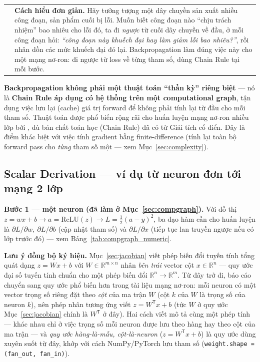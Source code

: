 \documentclass[12pt,a4paper]{article}
\makeatletter
\newenvironment{tructiep}[1][Cách hiểu đơn giản]
  {\par\smallskip\noindent\begin{tabular}{@{}p{0.35em}@{\hspace{6pt}}p{\dimexpr\linewidth-1.9em\relax}@{}}
   \textcolor{boxln}{\rule{2pt}{\baselineskip}} & \textbf{#1.}\enspace\ignorespaces}
  {\end{tabular}\par\smallskip}
\newcommand{\T}{^{\mathsf{T}}}
\makeatother
\begin{document}
\begin{tructiep}
Hãy tưởng tượng một dây chuyền sản xuất nhiều công đoạn, sản phẩm cuối bị
lỗi. Muốn biết công đoạn nào ``chịu trách nhiệm'' bao nhiêu cho lỗi đó, ta đi
\emph{ngược} từ cuối dây chuyền về đầu, ở mỗi công đoạn hỏi: \emph{``công
đoạn này khuếch đại hay làm giảm lỗi bao nhiêu?''}, rồi nhân dồn các mức
khuếch đại đó lại. Backpropagation làm đúng việc này cho một mạng nơ-ron:
đi ngược từ loss về từng tham số, dùng Chain Rule tại mỗi bước.
\end{tructiep}

\textbf{Backpropagation không phải một thuật toán ``thần kỳ'' riêng biệt} ---
nó là \textbf{Chain Rule áp dụng có hệ thống trên một computational graph},
tận dụng việc lưu lại (cache) giá trị forward để không phải tính lại từ
đầu cho mỗi tham số. Thuật toán được phổ biến rộng rãi cho huấn luyện mạng
nơ-ron nhiều lớp bởi \citet{rumelhart1986learning}, dù bản chất toán học
(Chain Rule) đã có từ Giải tích cổ điển. Đây là điểm khác biệt với việc
tính gradient bằng finite-difference (tính lại toàn bộ forward pass cho
\emph{từng} tham số một --- xem Mục~\ref{sec:complexity}).

\subsection{Scalar Derivation --- ví dụ từ neuron đơn tới mạng 2 lớp}
\label{sec:scalar}

\textbf{Bước 1 --- một neuron (đã làm ở Mục~\ref{sec:compgraph}).} Với đồ
thị $z=wx+b \to a=\mathrm{ReLU}(z) \to L=\tfrac12(a-y)^2$, ba đạo hàm cần
cho huấn luyện là $\partial L/\partial w,\ \partial L/\partial b$ (cập nhật
tham số) và $\partial L/\partial x$ (tiếp tục lan truyền ngược nếu có lớp
trước đó) --- xem Bảng~\ref{tab:compgraph_numeric}.

\textbf{Lưu ý đồng bộ ký hiệu.} Mục~\ref{sec:jacobian} viết phép biến đổi
tuyến tính tổng quát dạng $z=Wx+b$ với $W\in\mathbb R^{m\times n}$ nhân
\emph{bên trái} vector cột $x\in\mathbb R^n$ --- quy ước đại số tuyến tính
chuẩn cho một phép biến đổi $\mathbb R^n\to\mathbb R^m$. Từ đây trở đi,
báo cáo chuyển sang quy ước phổ biến hơn trong tài liệu mạng nơ-ron: mỗi
neuron có một vector trọng số riêng đặt theo \emph{cột} của ma trận $W$
(cột $k$ của $W$ là trọng số của neuron $k$), nên phép nhân tương ứng viết
$z=W\T x+b$ (tức $W$ ở quy ước Mục~\ref{sec:jacobian} chính là $W\T$ ở đây).
Hai cách viết mô tả cùng một phép tính --- khác nhau chỉ ở việc trọng số
mỗi neuron được lưu theo hàng hay theo cột của ma trận --- và \emph{quy
ước hàng-là-mẫu, cột-là-neuron} ($z=W\T x+b$) là quy ước dùng xuyên suốt
từ đây, khớp với cách NumPy/PyTorch lưu tham số (\texttt{weight.shape =
(fan\_out, fan\_in)}).
\end{document}
